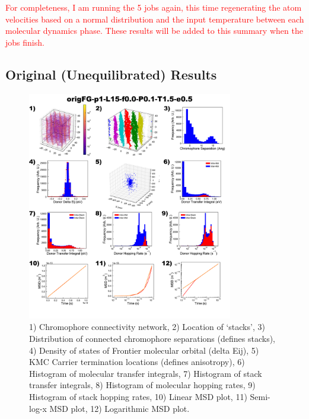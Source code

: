 \documentclass[12pt]{article}
\begin{document}
\textcolor{red}{For completeness, I am running the 5 jobs again, this time regenerating the atom velocities based on a normal distribution and the input temperature between each molecular dynamics phase.
These results will be added to this summary when the jobs finish.}

\clearpage

\subsection{Original (Unequilibrated) Results}


\begin{figure}[h]\centering
	\includegraphics[width=0.8\textwidth]{Figures/origFG-p1-L15-f0.0-P0.1-T1.5-e0.5.png}
    \caption{   1) Chromophore connectivity network, 
                2) Location of `stacks', 
                3) Distribution of connected chromophore separations (defines stacks),
                4) Density of states of Frontier molecular orbital (delta Eij),
                5) KMC Carrier termination locations (defines anisotropy),
                6) Histogram of molecular transfer integrals,
                7) Histogram of stack transfer integrals,
                8) Histogram of molecular hopping rates,
                9) Histogram of stack hopping rates,
                10) Linear MSD plot,
                11) Semi-log-x MSD plot,
                12) Logarithmic MSD plot.}
	\label{fig:UneqlT1.5}
\end{figure}
\end{document}
